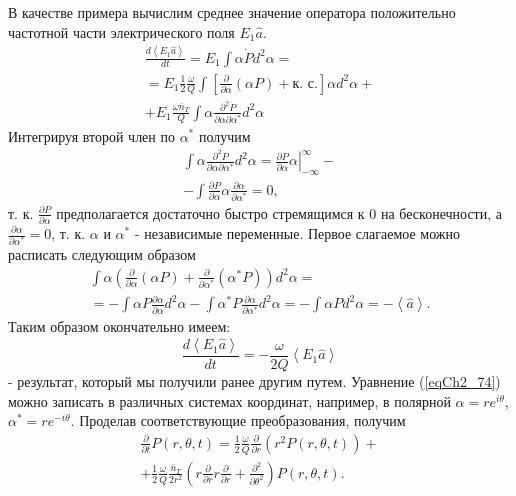 В качестве примера вычислим среднее значение оператора положительно
частотной части электрического поля $E_1\hat{a}$.   
\begin{eqnarray}
\frac{d \left<E_1\hat{a}\right>}{d t} = 
E_1\int \alpha \dot{P}d^2 \alpha =
\nonumber \\
=E_1 \frac{1}{2}\frac{\omega}{Q}
\int \left[
\frac{\partial}{\partial \alpha}\left(\alpha P\right) + \mbox{к. с.}
\right]\alpha d^2 \alpha +
\nonumber \\
+E_1\frac{\omega \bar{n}_T}{Q}\int \alpha
\frac{\partial^2 P}{\partial \alpha \partial \alpha^{*}}
d^2 \alpha
\label{eqCh2_75}
\end{eqnarray}
Интегрируя второй член по $\alpha^{*}$ получим
\begin{eqnarray}
\int\alpha\frac{\partial^2 P}{\partial \alpha \partial \alpha^{*}}
d^2 \alpha = 
\left.\frac{\partial P}{\partial
  \alpha}\alpha\right|_{-\infty}^{\infty} - 
\nonumber \\
- \int \frac{\partial P}{\partial \alpha} \alpha
\frac{\partial \alpha}{\partial \alpha^{*}} = 0,
\nonumber
\end{eqnarray}
т. к. $\frac{\partial P}{\partial \alpha}$ предполагается достаточно
быстро стремящимся к 0 на бесконечности, а 
$\frac{\partial \alpha}{\partial \alpha^{*}} = 0$, т. к. 
$\alpha$ и $\alpha^{*}$ - независимые переменные.
Первое слагаемое можно расписать следующим образом
\begin{eqnarray}
\int \alpha \left(
\frac{\partial}{\partial \alpha}\left(\alpha P\right) + 
\frac{\partial}{\partial \alpha^{*}}\left(\alpha^{*} P\right)
\right) d^2 \alpha = 
\nonumber \\
= - \int \alpha P \frac{\partial \alpha}{\partial \alpha} d^2 \alpha -
\int \alpha^{*} P \frac{\partial \alpha}{\partial \alpha^{*}} d^2 \alpha  
= - \int \alpha P  d^2 \alpha
= - \left<\hat{a}\right>.
\nonumber
\end{eqnarray}
Таким образом окончательно имеем: 
\begin{equation}
\frac{d \left<E_1\hat{a}\right>}{d t} = 
-\frac{\omega}{2 Q}\left<E_1\hat{a}\right>
\label{eqCh2_76}
\end{equation}
- результат, который мы получили ранее другим путем. Уравнение
(\ref{eqCh2_74}) можно записать в различных системах координат,
например, в полярной $\alpha = r e^{i \theta}$, $\alpha^{*} = r e^{- i
  \theta}$.  Проделав соответствующие преобразования, получим 
\begin{eqnarray}
\frac{\partial}{\partial t}P\left(r, \theta, t\right) = 
\frac{1}{2}\frac{\omega}{Q}
\frac{\partial}{\partial r}
\left(r^2 P\left(r, \theta, t\right)\right) +
\nonumber \\
+ \frac{1}{2}\frac{\omega}{Q}
\frac{\bar{n}_T}{2 r^2}
\left(
r \frac{\partial}{\partial r} r \frac{\partial}{\partial r} +
\frac{\partial^2}{\partial \theta^2}
\right)
P\left(r, \theta, t\right).
\label{eqCh2_77}
\end{eqnarray}
